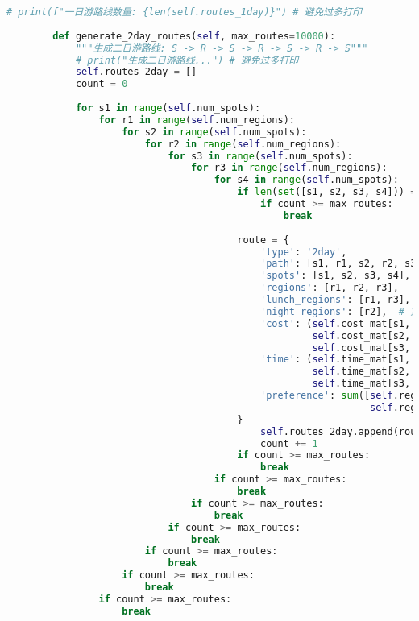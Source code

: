 \begin{lstlisting}[language=Python]
            # print(f"一日游路线数量: {len(self.routes_1day)}") # 避免过多打印
        
        def generate_2day_routes(self, max_routes=10000):
            """生成二日游路线: S -> R -> S -> R -> S -> R -> S"""
            # print("生成二日游路线...") # 避免过多打印
            self.routes_2day = []
            count = 0
            
            for s1 in range(self.num_spots):
                for r1 in range(self.num_regions):
                    for s2 in range(self.num_spots):
                        for r2 in range(self.num_regions):
                            for s3 in range(self.num_spots):
                                for r3 in range(self.num_regions):
                                    for s4 in range(self.num_spots):
                                        if len(set([s1, s2, s3, s4])) == 4:  # 所有景点不重复
                                            if count >= max_routes:
                                                break
                                            
                                        route = {
                                            'type': '2day',
                                            'path': [s1, r1, s2, r2, s3, r3, s4],
                                            'spots': [s1, s2, s3, s4],
                                            'regions': [r1, r2, r3],
                                            'lunch_regions': [r1, r3],  # 第1天午餐r1，第2天午餐r3
                                            'night_regions': [r2],  # 第1天住宿r2
                                            'cost': (self.cost_mat[s1, r1] + self.cost_mat[s2, r1] + 
                                                     self.cost_mat[s2, r2] + self.cost_mat[s3, r2] + 
                                                     self.cost_mat[s3, r3] + self.cost_mat[s4, r3]),
                                            'time': (self.time_mat[s1, r1] + self.time_mat[s2, r1] + 
                                                     self.time_mat[s2, r2] + self.time_mat[s3, r2] + 
                                                     self.time_mat[s3, r3] + self.time_mat[s4, r3]),
                                            'preference': sum([self.region_prefer[r1], self.region_prefer[r2], 
                                                               self.region_prefer[r3]]) + 4
                                        }
                                            self.routes_2day.append(route)
                                            count += 1
                                        if count >= max_routes:
                                            break
                                    if count >= max_routes:
                                        break
                                if count >= max_routes:
                                    break
                            if count >= max_routes:
                                break
                        if count >= max_routes:
                            break
                    if count >= max_routes:
                        break
                if count >= max_routes:
                    break
            

\end{lstlisting}
